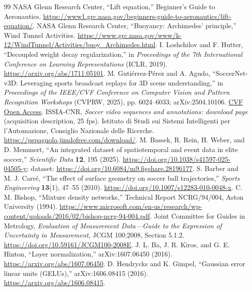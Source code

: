 \documentclass[11pt,a4paper]{article}
\begin{document}
\begin{thebibliography}{99}
 NASA Glenn Research Center, ``Lift equation,'' Beginner's Guide to Aeronautics. \url{https://www1.grc.nasa.gov/beginners-guide-to-aeronautics/lift-equation/}.
 NASA Glenn Research Center, ``Buoyancy: Archimedes' principle,'' Wind Tunnel Activities. \url{https://www.grc.nasa.gov/www/k-12/WindTunnel/Activities/buoy_Archimedes.html}.
 I. Loshchilov and F. Hutter, ``Decoupled weight decay regularization,'' in \emph{Proceedings of the 7th International Conference on Learning Representations} (ICLR, 2019). \url{https://arxiv.org/abs/1711.05101}.
 M. Guti\'errez-P\'erez and A. Agudo, ``SoccerNet-v3D: Leveraging sports broadcast replays for 3D scene understanding,'' in \emph{Proceedings of the IEEE/CVF Conference on Computer Vision and Pattern Recognition Workshops} (CVPRW, 2025), pp. 6024--6033; arXiv:2504.10106. \href{https://openaccess.thecvf.com/content/CVPR2025W/CVSPORTS/html/Gutierrez-Perez_SoccerNet-v3D_Leveraging_Sports_Broadcast_Replays_for_3D_Scene_Understanding_CVPRW_2025_paper.html}{CVF Open Access}.
 ISSIA-CNR, \emph{Soccer video sequences and annotations: download page} (acquisition description, 25 fps). Istituto di Studi sui Sistemi Intelligenti per l'Automazione, Consiglio Nazionale delle Ricerche. \url{https://pspagnolo.jimdofree.com/download/}.
 M. Bassek, R. Rein, H. Weber, and D. Memmert, ``An integrated dataset of spatiotemporal and event data in elite soccer,'' \emph{Scientific Data} \textbf{12}, 195 (2025). \url{https://doi.org/10.1038/s41597-025-04505-y}; dataset: \url{https://doi.org/10.6084/m9.figshare.28196177}.
 S. Barber and M. J. Carr\'e, ``The effect of surface geometry on soccer ball trajectories,'' \emph{Sports Engineering} \textbf{13}(1), 47--55 (2010). \url{https://doi.org/10.1007/s12283-010-0048-x}.
 C. M. Bishop, ``Mixture density networks,'' Technical Report NCRG/94/004, Aston University (1994). \url{https://www.microsoft.com/en-us/research/wp-content/uploads/2016/02/bishop-ncrg-94-004.pdf}.
 Joint Committee for Guides in Metrology, \emph{Evaluation of Measurement Data---Guide to the Expression of Uncertainty in Measurement}, JCGM 100:2008, Section 5.1.2. \url{https://doi.org/10.59161/JCGM100-2008E}.
 J. L. Ba, J. R. Kiros, and G. E. Hinton, ``Layer normalization,'' arXiv:1607.06450 (2016). \url{https://arxiv.org/abs/1607.06450}.
 D. Hendrycks and K. Gimpel, ``Gaussian error linear units (GELUs),'' arXiv:1606.08415 (2016). \url{https://arxiv.org/abs/1606.08415}.

\end{thebibliography}
\end{document}
